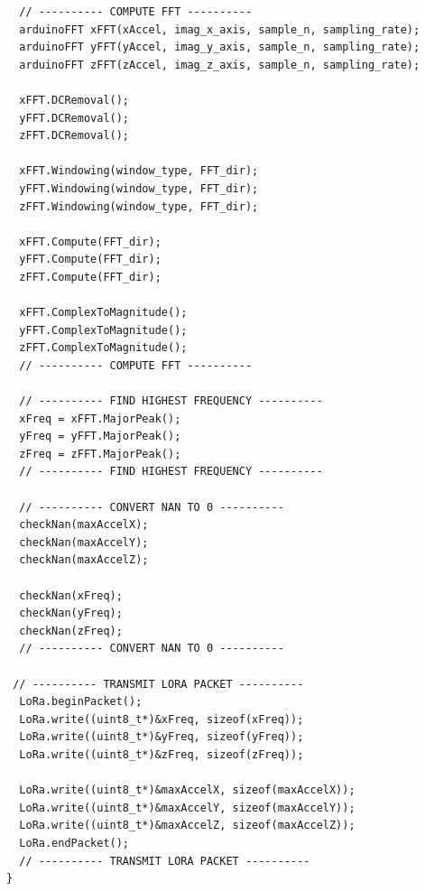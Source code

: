 \begin{verbatim}
  // ---------- COMPUTE FFT ----------
  arduinoFFT xFFT(xAccel, imag_x_axis, sample_n, sampling_rate);
  arduinoFFT yFFT(yAccel, imag_y_axis, sample_n, sampling_rate);
  arduinoFFT zFFT(zAccel, imag_z_axis, sample_n, sampling_rate);

  xFFT.DCRemoval();
  yFFT.DCRemoval();
  zFFT.DCRemoval();

  xFFT.Windowing(window_type, FFT_dir);
  yFFT.Windowing(window_type, FFT_dir);
  zFFT.Windowing(window_type, FFT_dir);

  xFFT.Compute(FFT_dir);
  yFFT.Compute(FFT_dir);
  zFFT.Compute(FFT_dir);

  xFFT.ComplexToMagnitude();
  yFFT.ComplexToMagnitude();
  zFFT.ComplexToMagnitude();
  // ---------- COMPUTE FFT ----------

  // ---------- FIND HIGHEST FREQUENCY ----------
  xFreq = xFFT.MajorPeak();
  yFreq = yFFT.MajorPeak();
  zFreq = zFFT.MajorPeak();
  // ---------- FIND HIGHEST FREQUENCY ----------

  // ---------- CONVERT NAN TO 0 ----------
  checkNan(maxAccelX); 
  checkNan(maxAccelY);
  checkNan(maxAccelZ);

  checkNan(xFreq); 
  checkNan(yFreq);
  checkNan(zFreq);
  // ---------- CONVERT NAN TO 0 ----------

 // ---------- TRANSMIT LORA PACKET ----------
  LoRa.beginPacket();
  LoRa.write((uint8_t*)&xFreq, sizeof(xFreq));
  LoRa.write((uint8_t*)&yFreq, sizeof(yFreq));  
  LoRa.write((uint8_t*)&zFreq, sizeof(zFreq));

  LoRa.write((uint8_t*)&maxAccelX, sizeof(maxAccelX));
  LoRa.write((uint8_t*)&maxAccelY, sizeof(maxAccelY));
  LoRa.write((uint8_t*)&maxAccelZ, sizeof(maxAccelZ));
  LoRa.endPacket();
  // ---------- TRANSMIT LORA PACKET ----------
}
\end{verbatim}

\clearpage

